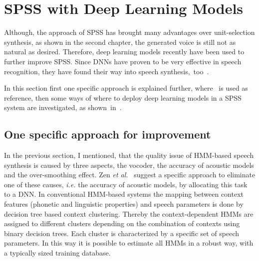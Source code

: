 \section{\ac{SPSS} with Deep Learning Models}
\label{sec:deepspeech}

Although, the approach of \ac{SPSS} has brought many advantages over unit-selection synthesis, as shown in the second chapter, the generated voice is still not as natural as desired. Therefore, deep learning models recently have been used to further improve \ac{SPSS}. Since \acfp{DNN} have proven to be very effective in speech recognition, they have found their way into speech synthesis,~too~\cite{hashimoto:effect}. %

In this section first one specific approach is explained further, where~\cite{zen:deepstatistical} is used as reference, then some ways of where to deploy deep learning models in a \ac{SPSS} system are investigated, as shown~in~\cite{hashimoto:effect}.

\subsection{One specific approach for improvement}
\label{subsec:deepspss}

In the previous section, I mentioned, that the quality issue of \ac{HMM}-based speech synthesis is caused by three aspects, the vocoder, the accuracy of acoustic models and the over-smoothing effect. Zen \textit{et al.}~\cite{zen:deepstatistical} suggest a specific approach to eliminate one of these causes, \textit{i.e.} the accuracy of acoustic models, by allocating this task to a \ac{DNN}. In conventional \ac{HMM}-based systems the mapping between context features (phonetic and linguistic properties) and speech parameters is done by decision tree based context clustering. Thereby the context-dependent \acp{HMM} are assigned to different clusters depending on the combination of contexts using binary decision trees. Each cluster is characterized by a specific set of speech parameters. In this way it is possible to estimate all \acp{HMM} in a robust way, with a typically sized training database.

